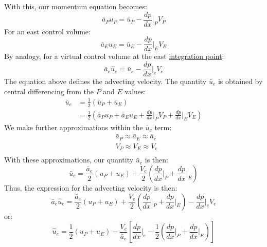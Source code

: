 \documentclass[11pt]{article}
\begin{document}
With this, our momentum equation becomes:
\begin{equation*}
\bar{a}_Pu_P = \bar{u}_P - \frac{dp}{dx}\biggr\rvert_P V_P
\end{equation*}
For an east control volume:
\begin{equation*}
\bar{a}_Eu_E = \bar{u}_E - \frac{dp}{dx}\biggr\rvert_E V_E
\end{equation*}
By analogy, for a virtual control volume at the east \uline{integration point}:
\begin{equation*}
\bar{a}_e\hat{u}_e = \bar{u}_e - \frac{dp}{dx}\biggr\rvert_e V_e
\end{equation*}
The equation above defines the advecting velocity. The quantity \(\bar{u}_e\) is obtained by
central differencing from the \(P\) and \(E\) values:
\begin{equation*}
\begin{aligned}
\bar{u}_e &= \frac{1}{2}(\bar{u}_P+\bar{u}_E)\\
&= \frac{1}{2}\left(\bar{a}_Pu_P + \bar{a}_Eu_E + 
\frac{dp}{dx}\biggr\rvert_P V_P + \frac{dp}{dx}\biggr\rvert_E V_E\right)
\end{aligned}
\end{equation*}
We make further approximations within the \(\bar{u}_e\) term:
\begin{equation*}
\begin{aligned}
&\bar{a}_P \approx \bar{a}_E \approx \bar{a}_e\\
&V_P \approx V_E \approx V_e\\
\end{aligned}
\end{equation*}
With these approximations, our quantity \(\bar{u}_e\) is then:
\begin{equation*}
\bar{u}_e = \frac{\bar{a}_e}{2}(u_P + u_E)
+ \frac{V_e}{2}\left( \frac{dp}{dx}\biggr\rvert_P +\frac{dp}{dx}\biggr\rvert_E \right)
\end{equation*}
Thus, the expression for the advecting velocity is then:
\begin{equation*}
\bar{a}_e\hat{u}_e = \frac{\bar{a}_e}{2}(u_P + u_E)
+ \frac{V_e}{2}\left( \frac{dp}{dx}\biggr\rvert_P + \frac{dp}{dx}\biggr\rvert_E \right)
- \frac{dp}{dx}\biggr\rvert_e V_e
\end{equation*}
or:
\begin{equation*}
\hat{u}_e = \frac{1}{2}(u_P + u_E)
- \frac{V_e}{\bar{a}_e}\left[ \frac{dp}{dx}\biggr\rvert_e -\frac{1}{2}
\left( \frac{dp}{dx}\biggr\rvert_P  + \frac{dp}{dx}\biggr\rvert_E  \right) \right]
\end{equation*}
\end{document}
